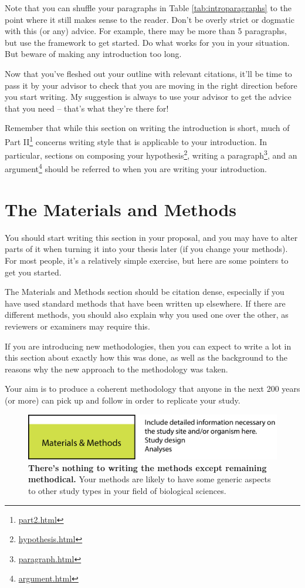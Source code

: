 \documentclass[
]{krantz}
\renewcommand{\href}[2]{#2\footnote{\url{#1}}}
\begin{document}
Note that you can shuffle your paragraphs in Table \ref{tab:introparagraphs} to the point where it still makes sense to the reader. Don't be overly strict or dogmatic with this (or any) advice. For example, there may be more than 5 paragraphs, but use the framework to get started. Do what works for you in your situation. But beware of making any introduction too long.

Now that you've fleshed out your outline with relevant citations, it'll be time to pass it by your advisor to check that you are moving in the right direction before you start writing. My suggestion is always to use your advisor to get the advice that you need -- that's what they're there for!

Remember that while this section on writing the introduction is short, much of \href{part2.html}{Part II} concerns writing style that is applicable to your introduction. In particular, sections on composing your \href{hypothesis.html}{hypothesis}, writing a \href{paragraph.html}{paragraph}, and an \href{argument.html}{argument} should be referred to when you are writing your introduction.

\hypertarget{methods}{%
\section{The Materials and Methods}\label{methods}}

You should start writing this section in your proposal, and you may have to alter parts of it when turning it into your thesis later (if you change your methods). For most people, it's a relatively simple exercise, but here are some pointers to get you started.

The Materials and Methods section should be citation dense, especially if you have used standard methods that have been written up elsewhere. If there are different methods, you should also explain why you used one over the other, as reviewers or examiners may require this.

If you are introducing new methodologies, then you can expect to write a lot in this section about exactly how this was done, as well as the background to the reasons why the new approach to the methodology was taken.

Your aim is to produce a coherent methodology that anyone in the next 200 years (or more) can pick up and follow in order to replicate your study.



\begin{figure}
\includegraphics[width=0.95\linewidth]{figures/methods} \caption{\textbf{There's nothing to writing the methods except remaining methodical.} Your methods are likely to have some generic aspects to other study types in your field of biological sciences.}\label{fig:methods}
\end{figure}
\end{document}
